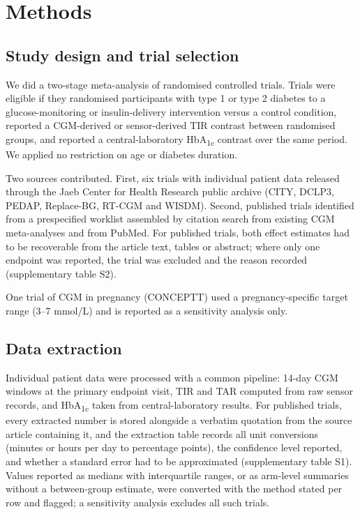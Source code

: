 \documentclass[11pt,a4paper]{article}
\begin{document}
\section{Methods}

\subsection{Study design and trial selection}
We did a two-stage meta-analysis of randomised controlled trials. Trials were eligible if they randomised
participants with type 1 or type 2 diabetes to a glucose-monitoring or insulin-delivery intervention versus
a control condition, reported a CGM-derived or sensor-derived TIR contrast between randomised groups, and
reported a central-laboratory HbA\textsubscript{1c} contrast over the same period. We applied no restriction
on age or diabetes duration.

Two sources contributed. First, six trials with individual patient data released through the Jaeb Center for
Health Research public archive (CITY, DCLP3, PEDAP, Replace-BG, RT-CGM and WISDM). Second, published
trials\citep{battelino2012,haak2017,bolinder2016,vanbeers2016,beck2017diamond,beck2017t2d,heinemann2018,bosi2019,martens2021,leelarathna2022,kim2022,jefferies2023,yoo2023,nz2024,munshi2025}
identified from a prespecified worklist assembled by citation search from existing CGM meta-analyses and from
PubMed. For published trials, both effect estimates had to be recoverable from the article text, tables or
abstract; where only one endpoint was reported, the trial was excluded and the reason recorded
(supplementary table S2).

One trial of CGM in pregnancy (CONCEPTT)\citep{feig2017} used a pregnancy-specific target range
(3--7 mmol/L) and is reported as a sensitivity analysis only.

\subsection{Data extraction}
Individual patient data were processed with a common pipeline: 14-day CGM windows at the primary endpoint
visit, TIR and TAR computed from raw sensor records, and HbA\textsubscript{1c} taken from central-laboratory
results. For published trials, every extracted number is stored alongside a verbatim quotation from the
source article containing it, and the extraction table records all unit conversions (minutes or hours per day
to percentage points), the confidence level reported, and whether a standard error had to be approximated
(supplementary table S1). Values reported as medians with interquartile ranges, or as arm-level summaries
without a between-group estimate, were converted with the method stated per row and flagged; a sensitivity
analysis excludes all such trials.
\end{document}
